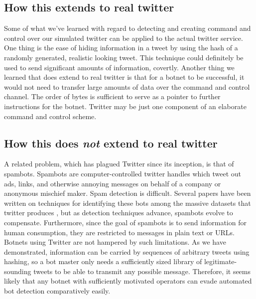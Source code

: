 \documentclass[11pt, oneside]{article} %
\numberwithin{equation}{section} %
\numberwithin{figure}{section} %
\numberwithin{table}{section} %
\begin{document}
	\subsection{How this extends to real twitter}
	Some of what we've learned with regard to detecting and creating command and control over our simulated twitter can be applied to the
	actual twitter service. One thing is the ease of hiding information in a tweet by using the hash of a randomly generated, realistic looking tweet.
	This technique could definitely be used to send significant amounts of information, covertly. Another thing we learned that does extend to real
	twitter is that for a botnet to be successful, it would not need to transfer large amounts of data over the command and control channel. The order of
	bytes is sufficient to serve as a pointer to further instructions for the botnet. Twitter may be just one component of an elaborate command and control scheme.

	\subsection{How this does \textit{not} extend to real twitter}
    A related problem, which has plagued Twitter since its inception, is that of spambots. Spambots are computer-controlled twitter handles which tweet out ads, links, and otherwise annoying messages on behalf of a company or anonymous mischief maker. Spam detection is difficult. Several papers have been written on techniques for identifying these bots among the massive datasets that twitter produces \cite{botdetect} \cite{spambotML} \cite{socialnet_spam}, but as detection techniques advance, spambots evolve to compensate. Furthermore, since the goal of spambots is to send information for human consumption, they are restricted to messages in plain text or URLs. Botnets using Twitter are not hampered by such limitations. As we have demonstrated, information can be carried by sequences of arbitrary tweets using hashing, so a bot master only needs a sufficiently sized library of legitimate-sounding tweets to be able to transmit any possible message. Therefore, it seems likely that any botnet with sufficiently motivated operators can evade automated bot detection comparatively easily.
\end{document}
